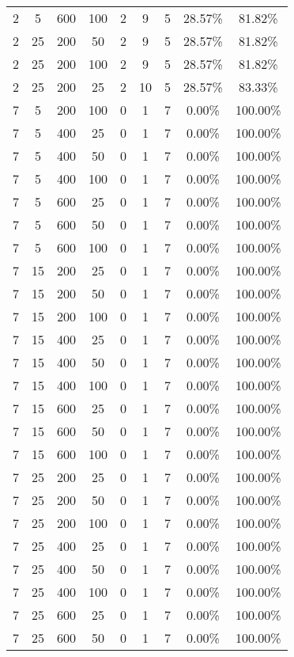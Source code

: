 \documentclass[11pt]{article}
\begin{document}
\begin{center}
{\begin{longtable}{| c | c | c | c | c | c | c | c | c |}
 2 & 5 & 600 & 100 & 2 & 9 & 5 & 28.57\% & 81.82\%   \\
 2 & 25 & 200 & 50 & 2 & 9 & 5 & 28.57\% & 81.82\%   \\
 2 & 25 & 200 & 100 & 2 & 9 & 5 & 28.57\% & 81.82\%   \\
 2 & 25 & 200 & 25 & 2 & 10 & 5 & 28.57\% & 83.33\%   \\
 7 & 5 & 200 & 100 & 0 & 1 & 7 & 0.00\% & 100.00\%   \\
 7 & 5 & 400 & 25 & 0 & 1 & 7 & 0.00\% & 100.00\%   \\
 7 & 5 & 400 & 50 & 0 & 1 & 7 & 0.00\% & 100.00\%   \\
 7 & 5 & 400 & 100 & 0 & 1 & 7 & 0.00\% & 100.00\%   \\
 7 & 5 & 600 & 25 & 0 & 1 & 7 & 0.00\% & 100.00\%   \\
 7 & 5 & 600 & 50 & 0 & 1 & 7 & 0.00\% & 100.00\%   \\
 7 & 5 & 600 & 100 & 0 & 1 & 7 & 0.00\% & 100.00\%   \\
 7 & 15 & 200 & 25 & 0 & 1 & 7 & 0.00\% & 100.00\%   \\
 7 & 15 & 200 & 50 & 0 & 1 & 7 & 0.00\% & 100.00\%   \\
 7 & 15 & 200 & 100 & 0 & 1 & 7 & 0.00\% & 100.00\%   \\
 7 & 15 & 400 & 25 & 0 & 1 & 7 & 0.00\% & 100.00\%   \\
 7 & 15 & 400 & 50 & 0 & 1 & 7 & 0.00\% & 100.00\%   \\
  7 & 15 & 400 & 100 & 0 & 1 & 7 & 0.00\% & 100.00\%   \\
 7 & 15 & 600 & 25 & 0 & 1 & 7 & 0.00\% & 100.00\%   \\
 7 & 15 & 600 & 50 & 0 & 1 & 7 & 0.00\% & 100.00\%   \\
 7 & 15 & 600 & 100 & 0 & 1 & 7 & 0.00\% & 100.00\%   \\
 7 & 25 & 200 & 25 & 0 & 1 & 7 & 0.00\% & 100.00\%   \\
 7 & 25 & 200 & 50 & 0 & 1 & 7 & 0.00\% & 100.00\%   \\
 7 & 25 & 200 & 100 & 0 & 1 & 7 & 0.00\% & 100.00\%   \\
 7 & 25 & 400 & 25 & 0 & 1 & 7 & 0.00\% & 100.00\%   \\
 7 & 25 & 400 & 50 & 0 & 1 & 7 & 0.00\% & 100.00\%   \\
 7 & 25 & 400 & 100 & 0 & 1 & 7 & 0.00\% & 100.00\%   \\
 7 & 25 & 600 & 25 & 0 & 1 & 7 & 0.00\% & 100.00\%   \\
 7 & 25 & 600 & 50 & 0 & 1 & 7 & 0.00\% & 100.00\%   \\

\end{longtable}}
\end{center}
\end{document}
